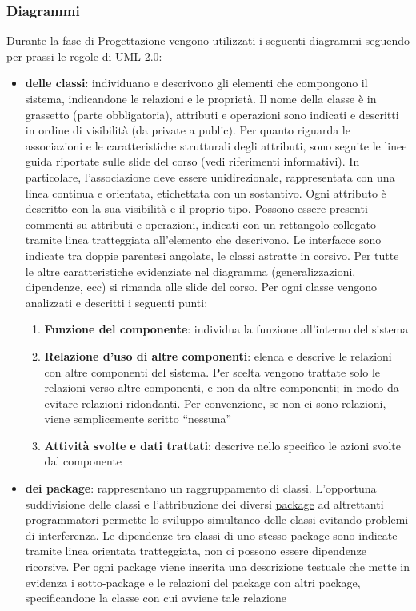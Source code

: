 \documentclass[a4paper,11pt]{article}
\begin{document}
\subsubsection{Diagrammi}
Durante la fase di Progettazione vengono utilizzati i seguenti diagrammi seguendo per prassi le regole di UML 2.0:
\begin{itemize}
\item \textbf{delle classi}: individuano e descrivono gli elementi che compongono il sistema, indicandone le relazioni e le propriet\`a. Il nome della classe \`e in grassetto (parte obbligatoria), attributi e operazioni sono indicati e descritti in ordine di visibilit\`a (da private a public). Per quanto riguarda le associazioni e le caratteristiche strutturali degli attributi, sono seguite le linee guida riportate sulle slide del corso (vedi riferimenti informativi). In particolare, l'associazione deve essere unidirezionale, rappresentata con una linea continua e orientata, etichettata con un sostantivo. Ogni attributo \`e descritto con la sua visibilit\`a e il proprio tipo. Possono essere presenti commenti su attributi e operazioni, indicati con un rettangolo collegato tramite linea tratteggiata all'elemento che descrivono. Le interfacce sono indicate tra doppie parentesi angolate, le classi astratte in corsivo. Per tutte le altre caratteristiche evidenziate nel diagramma (generalizzazioni, dipendenze, ecc) si rimanda alle slide del corso.
Per ogni classe vengono analizzati e descritti i seguenti punti:
\begin{enumerate}
\item \textbf{Funzione del componente}: individua la funzione all'interno del sistema
\item \textbf{Relazione d'uso di altre componenti}: elenca e descrive le relazioni con altre componenti del sistema. Per scelta vengono trattate solo le relazioni verso altre componenti, e non da altre componenti; in modo da evitare relazioni ridondanti. Per convenzione, se non ci sono relazioni, viene semplicemente scritto ``nessuna''  
\item \textbf{Attivit\`a svolte e dati trattati}: descrive nello specifico le azioni svolte dal componente
\end{enumerate}
\item \textbf{dei package}: rappresentano un raggruppamento di classi. L'opportuna suddivisione delle classi e l'attribuzione dei diversi \underline{package} ad altrettanti programmatori permette lo sviluppo simultaneo delle classi evitando problemi di interferenza. Le dipendenze tra classi di uno stesso package sono indicate tramite linea orientata tratteggiata, non ci possono essere dipendenze ricorsive. Per ogni package viene inserita una descrizione testuale che mette in evidenza i sotto-package e le relazioni del package con altri package, specificandone la classe con cui avviene tale relazione

\end{itemize}
\end{document}
